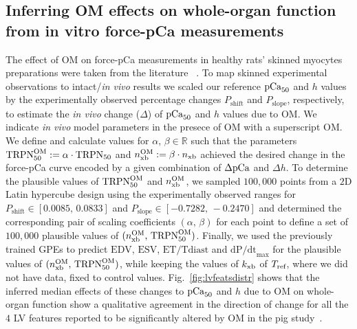\subsection{Inferring OM effects on whole-organ function from in vitro force-pCa measurements}\label{ch5casetwo}
The effect of OM on force-pCa measurements in healthy rats' skinned myocytes preparations were taken from the literature ~\cite{Nagy:2015, Kampourakis:2018, Kieu:2019}. To map skinned experimental observations to intact/\textit{in vivo} results we scaled our reference $\textrm{pCa}_{50}$ and $h$ values by the experimentally observed percentage changes $P_{\textrm{shift}}$ and $P_{\textrm{slope}}$, respectively, to estimate the \textit{in vivo} change ($\Delta$) of $\textrm{pCa}_{50}$ and $h$ values due to OM. We indicate \textit{in vivo} model parameters in the presece of OM with a superscript OM. We define and calculate values for $\alpha,\,\beta\in\mathbb{R}$ such that  the parameters $\textrm{TRPN}_{50}^{\textrm{OM}} := \alpha\cdot \textrm{TRPN}_{50}$ and $n_{\textrm{xb}}^{\textrm{OM}} := \beta\cdot n_{\textrm{xb}}$ achieved the desired change in the force-pCa curve encoded by a given combination of $\Delta\textrm{pCa}$ and $\Delta h$. To determine the plausible values of $\textrm{TRPN}_{50}^{\textrm{OM}}$ and $n_{\textrm{xb}}^{\textrm{OM}}$, we sampled $100,000$ points from a $2$D Latin hypercube design using the experimentally observed ranges for $P_{\textrm{shift}}\in [0.0085,\,0.0833]$ and $P_{\textrm{slope}}\in [-0.7282,\,-0.2470]$ and determined the corresponding pair of scaling coefficients $(\alpha,\,\beta)$ for each point to define a set of $100,000$ plausible values of $(n_{\textrm{xb}}^{\textrm{OM}},\, \textrm{TRPN}_{50}^{\textrm{OM}})$. Finally, we used the previously trained GPEs to predict $\textrm{EDV}$, $\textrm{ESV}$, $\textrm{ET/Tdiast}$ and $\textrm{dP/dt}_\textrm{max}$ for the plausible values of $(n_{\textrm{xb}}^{\textrm{OM}},\, \textrm{TRPN}_{50}^{\textrm{OM}})$, while keeping the values of $k_{\textrm{xb}}$ of $T_{\textrm{ref}}$, where we did not have data, fixed to control values. Fig.~\ref{fig:lvfeatsdistr} shows that the inferred median effects of these changes to $\textrm{pCa}_{50}$ and $h$ due to OM on whole-organ function show a qualitative agreement in the direction of change for all the $4$ LV features reported to be significantly altered by OM in the pig study~\cite{Bakkehaug:2015}.


